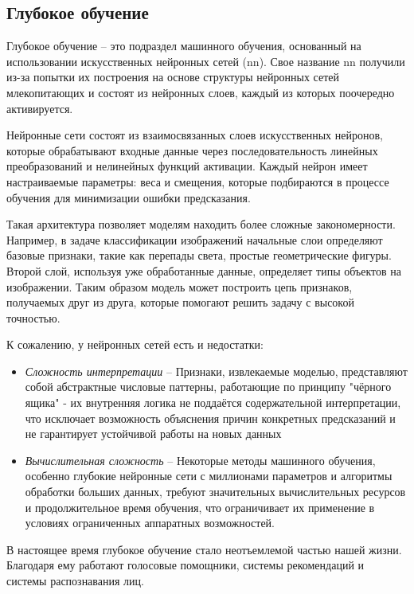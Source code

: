 \documentclass[../part_1.tex]{subfiles}
\begin{document}
\subsection{Глубокое обучение}
\par Глубокое обучение -- это подраздел машинного обучения, основанный на использовании искусственных нейронных сетей (\acrshort{nn}). Свое название \acrshort{nn} получили из-за попытки их построения на основе структуры нейронных сетей млекопитающих и состоят из нейронных слоев, каждый из которых поочередно активируется.
\par Нейронные сети состоят из взаимосвязанных слоев искусственных нейронов, которые обрабатывают входные данные через последовательность линейных преобразований и нелинейных функций активации. Каждый нейрон имеет настраиваемые параметры: веса и смещения, которые подбираются в процессе обучения для минимизации ошибки предсказания. 
\par Такая архитектура позволяет моделям находить более сложные закономерности. Например, в задаче классификации изображений начальные слои определяют базовые признаки, такие как перепады света, простые геометрические фигуры. Второй слой, используя уже обработанные данные, определяет типы объектов на изображении. Таким образом модель может построить цепь признаков, получаемых друг из друга, которые помогают решить задачу с высокой точностью.
\par К сожалению, у нейронных сетей есть и недостатки:
\begin{itemize}
    \item \textit{Сложность интерпретации} -- Признаки, извлекаемые моделью, представляют собой абстрактные числовые паттерны, работающие по принципу "чёрного ящика" - их внутренняя логика не поддаётся содержательной интерпретации, что исключает возможность объяснения причин конкретных предсказаний и не гарантирует устойчивой работы на новых данных
    \item \textit{Вычислительная сложность} -- Некоторые методы машинного обучения, особенно глубокие нейронные сети с миллионами параметров и алгоритмы обработки больших данных, требуют значительных вычислительных ресурсов и продолжительное время обучения, что ограничивает их применение в условиях ограниченных аппаратных возможностей.
\end{itemize}
\par В настоящее время глубокое обучение стало неотъемлемой частью нашей жизни. Благодаря ему работают голосовые помощники, системы рекомендаций и системы распознавания лиц.
\end{document}

